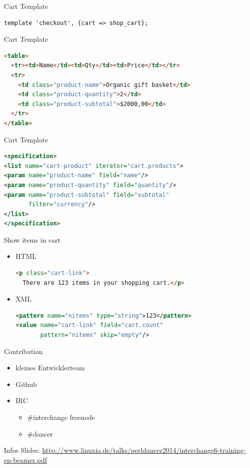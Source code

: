 \begin{frame}[fragile]{Cart Template}
\begin{lstlisting}
template 'checkout', {cart => shop_cart};
\end{lstlisting}
\end{frame}

\begin{frame}[fragile]{Cart Template}
\begin{lstlisting}[language=html]
<table>
  <tr><td>Name</td><td>Qty</td><td>Price</td></tr>
  <tr>
    <td class="product-name">Organic gift basket</td>
    <td class="product-quantity">2</td>
    <td class="product-subtotal">$2000,00</td>
  </tr>
</table>
\end{lstlisting}
\end{frame}

\begin{frame}[fragile]{Cart Template}
\begin{lstlisting}[language=xml]
<specification>
<list name="cart-product" iterator="cart.products">
<param name="product-name" field="name"/>
<param name="product-quantity" field="quantity"/>
<param name="product-subtotal" field="subtotal" 
       filter="currency"/>
</list>
</specification>
\end{lstlisting}
\end{frame}

\begin{frame}[fragile]{Show items in cart}
\begin{itemize}
\item HTML
\begin{lstlisting}[language=html]
<p class="cart-link">
  There are 123 items in your shopping cart.</p>
\end{lstlisting}
\item XML
\begin{lstlisting}[language=xml]
<pattern name="nitems" type="string">123</pattern>
<value name="cart-link" field="cart.count"
       pattern="nitems" skip="empty"/>
\end{lstlisting}
\end{itemize}
\end{frame}

\begin{frame}{Contribution}
\begin{itemize}
\item kleines Entwicklerteam
\item Github
\item IRC 
\begin{itemize}
\item \#interchange freenode
\item \#dancer
\end{itemize}
\end{itemize}
\end{frame}

\begin{frame}{Infos}
Slides:
\url{http://www.linuxia.de/talks/perldancer2014/interchange6-training-en-beamer.pdf}
\end{frame}




